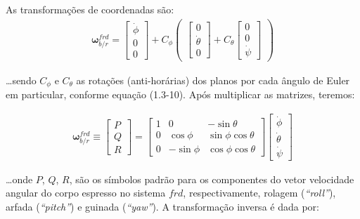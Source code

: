 As transformações de coordenadas são:
\begin{align*}
    \mathbf{\omega}^{frd}_{b/r} = \begin{bmatrix} \dot\phi \\ 0 \\0 \end{bmatrix}
    + C_{\phi} \begin{pmatrix}
        \begin{bmatrix} 0 \\ \dot\theta \\ 0 \end{bmatrix}
        + C_{\theta}\begin{bmatrix} 0 \\ 0 \\ \dot\psi \end{bmatrix}
    \end{pmatrix}
\end{align*}

\ldots sendo \(C_{\phi}\) e \(C_{\theta}\)  as rotações (anti-horárias) dos
planos por cada ângulo de Euler em particular, conforme equação (1.3-10). Após
multiplicar as matrizes, teremos:

\begin{align} \tag{1.4-3}
    \mathbf{\omega}^{frd}_{b/r} \equiv \begin{bmatrix} P \\ Q \\ R \end{bmatrix}
    = \begin{bmatrix}
        1 & 0 & -\sin{\theta} \\
        0 & \cos{\phi} & \sin{\phi}\cos{\theta} \\
        0 & -\sin{\phi} & \cos{\phi}\cos{\theta}
    \end{bmatrix}
    \begin{bmatrix}
        \dot\phi \\
        \dot\theta \\
        \dot\psi
    \end{bmatrix}
\end{align}

\ldots onde \(P\), \(Q\), \(R\), são os símbolos padrão para os componentes do
vetor velocidade angular do corpo espresso no sistema \(frd\), respectivamente,
rolagem (\emph{``roll''}), arfada (\emph{``pitch''}) e guinada
(\emph{``yaw''}). A transformação inversa é dada por:

